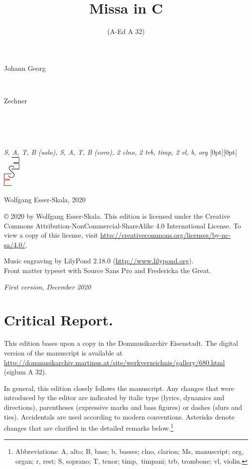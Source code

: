 \documentclass[parskip=full]{scrreprt}
\makeatletter
\DeclareRobustCommand{\sbseries}{\fontseries{sb}\selectfont}
\newcommand\fancytitlehead{
	\headingfont%
	\fontsize{80}{80}\selectfont\textcolor{black!80}{\@ifundefined{@shortname}{\@lastname}{\@shortname}.}\\[15pt]%
	\fontsize{60}{60}\selectfont\@ifundefined{@shorttitle}{\@title}{\@shorttitle}.%
}
\def\firstname#1{\def\@firstname{#1}}
\def\lastname#1{\def\@lastname{#1}}
\def\instrumentation#1{\def\@instrumentation{#1}}
\def\maketitle{%
\begin{titlepage}%
	\Large%
	{\@titlehead}%
	\vfill%
	{\strut\@firstname}\\%
	{\sbseries\color{oldred}\strut\@lastname}\\%
	{\strut\@namesuffix}%
	\vfill%
	{\sbseries\@title}\\%
	{\@subtitle}\\[\baselineskip]%
	{\itshape\@instrumentation}%
	\vfill%
	{\itshape\@parts}\hspace*{\fill}\raisebox{0pt}[0pt][0pt]{\includegraphics{ees_logo}}%
\end{titlepage}%
}
\newif\ifprintreport\printreportfalse
\makeatother
\begin{document}
\frenchspacing

\titlehead{\fancytitlehead}
\firstname{Johann Georg}
\lastname{Zechner}
\title{Missa in C}
\subtitle{(A-Ed A 32)}
\instrumentation{S, A, T, B (solo), S, A, T, B (coro), 2 clno, 2 trb, timp, 2 vl, b, org}
\maketitle


\thispagestyle{empty}

\vspace*{\fill}

\hspace*{1em}Wolfgang Esser-Skala, 2020

© 2020 by Wolfgang Esser-Skala. This edition is licensed under the Creative Commons Attribution-NonCommercial-ShareAlike 4.0 International License. To view a copy of this license, visit \url{http://creativecommons.org/licenses/by-nc-sa/4.0/}. 

Music engraving by LilyPond 2.18.0 (\url{http://www.lilypond.org}).\\
Front matter typeset with Source Sans Pro and Fredericka the Great.

\textit{First version, December 2020}

\vspace*{2cm}

\ifprintreport
\chapter*{Critical Report.}

This edition bases upon a copy in the Dommusikarchiv Eisenstadt. The digital version of the manuscript is available at \url{http://dommusikarchiv.martinus.at/site/werkverzeichnis/gallery/680.html} (siglum A 32).

In general, this edition closely follows the manuscript. Any changes that were introduced by the editor are indicated by italic type (lyrics, dynamics and directions), parentheses (expressive marks and bass figures) or dashes (slurs and ties). Accidentals are used according to modern conventions. Asterisks denote changes that are clarified in the detailed remarks below.\footnote{Abbreviations: A, alto; B, bass; b, basses; clno, clarion; Ms, manuscript; org, organ; r, rest; S, soprano; T, tenor; timp,~timpani; trb, trombone; vl, violin.}
\end{document}
